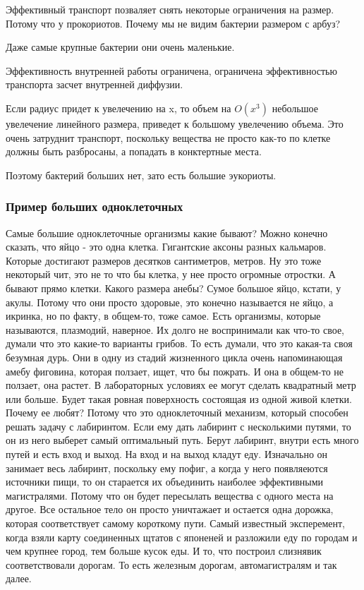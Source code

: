 Эффективный транспорт позваляет снять некоторые ограничения на размер. 
Потому что у прокориотов. Почему мы не видим бактерии размером с арбуз? 

Даже самые крупные бактерии они очень маленькие. 

Эффективность внутренней работы ограничена, ограничена эффективностью 
транспорта засчет внутренней диффузии. 

Если радиус придет к увелечению на x, то объем на $O(x^3)$ небольшое 
увелечение линейного размера, 
приведет к большому увелечению объема. Это очень затруднит 
транспорт, поскольку вещества не просто как-то 
по клетке должны быть разбросаны, а попадать 
в конктертные места. 

Поэтому бактерий больших нет, зато есть большие эукориоты. 

\subsubsection{Пример больших одноклеточных}
Самые большие одноклеточные организмы какие бывают? 
Можно конечно сказать, что яйцо - это 
одна клетка. Гигантские аксоны разных 
кальмаров. Которые достигают размеров десятков 
сантиметров, метров. Ну это тоже некоторый чит, 
это не то что бы клетка, у нее просто огромные отростки. 
А бывают прямо клетки. Какого размера анебы? Сумое
большое яйцо, кстати, у акулы. Потому что они просто
здоровые, это конечно называется не яйцо,
а икринка, но по факту, в общем-то, тоже самое.
Есть организмы, которые называются, плазмодий, наверное.
Их долго не воспринимали как что-то свое, думали что
это какие-то варианты грибов. То есть думали, что
это какая-та своя безумная дурь. Они в одну из
стадий жизненного цикла очень напоминающая амебу фиговина,
которая ползает, ищет, что бы пожрать. И она в общем-то
не ползает, она растет. В лабораторных условиях
ее могут сделать квадратный метр или больше. Будет такая
ровная поверхность состоящая из одной живой клетки.
Почему ее любят? Потому что это одноклеточный механизм,
который способен решать задачу с лабиринтом. Если
ему дать лабиринт с несколькими путями, то
он из него выберет самый оптимальный путь.
Берут лабиринт, внутри есть много путей и есть
вход и выход. На вход и на выход кладут еду.
Изначально он занимает весь лабиринт, поскольку
ему пофиг, а когда у него
появляеются источники пищи, то он старается их объединить
наиболее эффективными магистралями. Потому что он будет пересылать
вещества с одного места на другое. Все остальное тело он
просто уничтажает и остается одна
дорожка, которая соответствует самому короткому пути.
Самый известный эксперемент, когда взяли карту соединенных 
щтатов с японеней и разложили еду по городам и чем крупнее 
город, тем больше кусок еды. И то, что построил слизнявик 
соответствовали дорогам. То есть железным дорогам, 
автомагистралям и так далее. 

